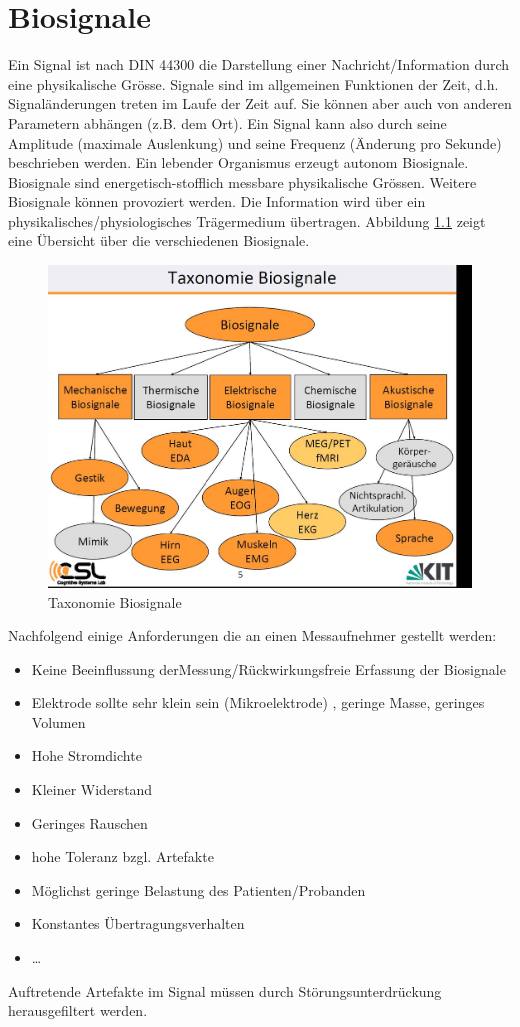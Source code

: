 \chapter{Biosignale}

Ein Signal ist nach DIN 44300 die Darstellung einer Nachricht/Information durch eine physikalische Grösse. Signale sind im allgemeinen Funktionen der Zeit, d.h. Signaländerungen treten im Laufe der Zeit auf. Sie können aber auch von anderen Parametern abhängen (z.B. dem Ort). Ein Signal kann also durch seine Amplitude (maximale Auslenkung) und seine Frequenz (Änderung pro Sekunde) beschrieben werden.
Ein lebender Organismus erzeugt autonom Biosignale. Biosignale sind energetisch-stofflich messbare physikalische Grössen. Weitere Biosignale können provoziert werden. Die Information wird über ein physikalisches/physiologisches Trägermedium übertragen. Abbildung \ref{fig:biosignale} zeigt eine Übersicht über die verschiedenen Biosignale.

\begin{figure}
\centering
\includegraphics[width=0.7\linewidth]{fig/biosignale}
\caption{Taxonomie Biosignale}
\label{fig:biosignale}
\end{figure}

Nachfolgend einige Anforderungen die an einen Messaufnehmer gestellt werden:
\begin{itemize}
	\item Keine Beeinflussung derMessung/Rückwirkungsfreie Erfassung der Biosignale
	\item Elektrode sollte sehr klein sein (Mikroelektrode) , geringe Masse, geringes Volumen
	\item Hohe Stromdichte
	\item Kleiner Widerstand
	\item Geringes Rauschen
	\item hohe Toleranz bzgl. Artefakte
	\item Möglichst geringe Belastung des Patienten/Probanden
	\item Konstantes Übertragungsverhalten
	\item \dots
\end{itemize}
Auftretende Artefakte im Signal müssen durch Störungsunterdrückung herausgefiltert werden.